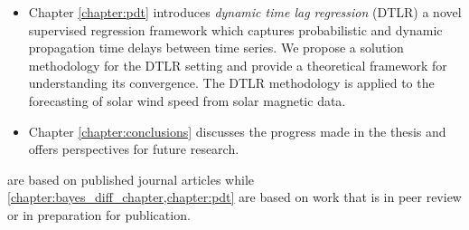 \begin{itemize}
    \item Chapter \ref{chapter:pdt} introduces \emph{dynamic time lag regression} (DTLR) a novel supervised 
    regression framework which captures probabilistic and dynamic propagation time delays between time series. 
    We propose a solution methodology for the DTLR setting and provide a theoretical framework for understanding 
    its convergence. The DTLR methodology is applied to the forecasting of solar wind speed from solar magnetic data. 
    
    \item Chapter \ref{chapter:conclusions} discusses the progress made in the thesis and offers perspectives for 
    future research.
\end{itemize}


 are based on published journal articles 
while \cref{chapter:bayes_diff_chapter,chapter:pdt} are based on work that is in peer review or in 
preparation for publication.  